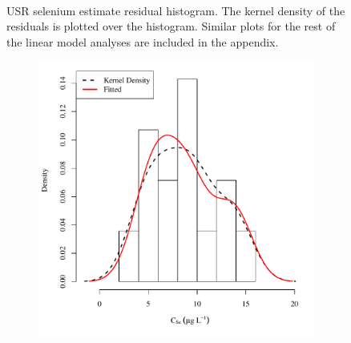 \begin{linenumbers}
\begin{landscape}
\begin{figure}
\begin{subfigure}{0.7\textwidth}
		\end{subfigure}\\
		\caption[USR selenium estimate residual histogram.]{USR selenium estimate residual histogram.  The kernel density of the residuals is plotted over the histogram.  Similar plots for the rest of the linear model analyses are included in the appendix.}
		\label{fig:concResHist_US}
	\end{figure}
\end{landscape}

\subfiguremid
\begin{landscape}
	\begin{figure}
		\begin{subfigure}{0.7\textwidth}
			\centering
			\includegraphics[width=\tableCustomSize]{"Figures/Results_USR/Stochastic/Conc Model ResDist U167"}
		\end{subfigure}%
		\begin{subfigure}{0.7\textwidth}
			\centering

\end{subfigure}
\end{figure}
\end{landscape}
\end{linenumbers}
